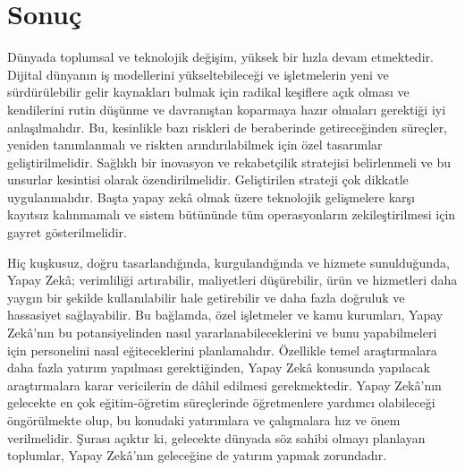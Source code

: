 \documentclass{article}
\begin{document}
\newpage
\section{Sonuç}
\begin{multicols}{2}

Dünyada toplumsal ve teknolojik değişim, yüksek bir hızla devam etmektedir.
Dijital dünyanın iş modellerini yükseltebileceği ve işletmelerin yeni ve sürdürülebilir gelir kaynakları bulmak için radikal keşiflere açık olması ve kendilerini rutin
düşünme ve davranıştan koparmaya hazır olmaları gerektiği iyi anlaşılmalıdır.
Bu, kesinlikle bazı riskleri de beraberinde getireceğinden süreçler, yeniden tanımlanmalı ve riskten arındırılabilmek için özel tasarımlar geliştirilmelidir. Sağlıklı bir inovasyon ve rekabetçilik stratejisi belirlenmeli ve bu unsurlar kesintisi
olarak özendirilmelidir. Geliştirilen strateji çok dikkatle uygulanmalıdır. Başta
yapay zekâ olmak üzere teknolojik gelişmelere karşı kayıtsız kalınmamalı ve sistem bütününde tüm operasyonların zekileştirilmesi için gayret gösterilmelidir. 

Hiç kuşkusuz, doğru tasarlandığında, kurgulandığında ve hizmete sunulduğunda, Yapay Zekâ; verimliliği artırabilir, maliyetleri düşürebilir, ürün ve hizmetleri daha yaygın bir şekilde kullanılabilir hale getirebilir ve daha fazla doğruluk ve
hassasiyet sağlayabilir. Bu bağlamda, özel işletmeler ve kamu kurumları, Yapay
Zekâ’nın bu potansiyelinden nasıl yararlanabileceklerini ve bunu yapabilmeleri
için personelini nasıl eğiteceklerini planlamalıdır. Özellikle temel araştırmalara
daha fazla yatırım yapılması gerektiğinden, Yapay Zekâ konusunda yapılacak
araştırmalara karar vericilerin de dâhil edilmesi gerekmektedir. Yapay Zekâ’nın
gelecekte en çok eğitim-öğretim süreçlerinde öğretmenlere yardımcı olabileceği
öngörülmekte olup, bu konudaki yatırımlara ve çalışmalara hız ve önem verilmelidir. Şurası açıktır ki, gelecekte dünyada söz sahibi olmayı planlayan toplumlar, Yapay Zekâ’nın geleceğine de yatırım yapmak zorundadır.


\end{multicols}
\end{document}
